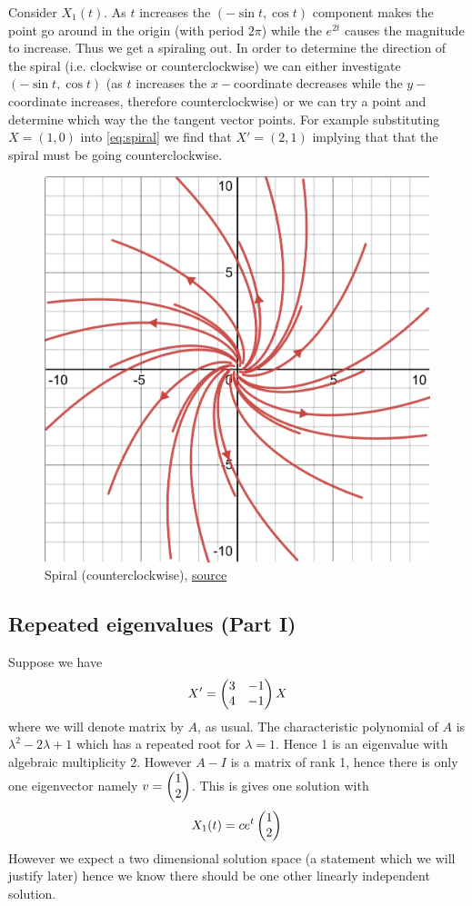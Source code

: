Consider $X_1(t)$. As $t$ increases the $(-\sin t, \cos t)$ component makes the point go around in the origin (with period $2\pi$) while the $e^{2t}$ causes the magnitude to increase. Thus we get a spiraling out. In order to determine the direction of the spiral (i.e. clockwise or counterclockwise) we can either investigate $(-\sin t, \cos t)$ (as $t$ increases the $x-$coordinate decreases while the $y-$coordinate increases, therefore counterclockwise) or we can try a point and determine which way the the tangent vector points. For example substituting $X = (1, 0)$ into \autoref{eq:spiral} we find that $X' = (2, 1)$ implying that that the spiral must be going counterclockwise.


\begin{figure}[ht]
    \centering
    \includegraphics[scale=0.25]{Images/spiral.png}
    \caption{Spiral (counterclockwise), \href{https://www.desmos.com/calculator/sebsp8likc}{source}}
    \label{fig:sprial-cc}
\end{figure}

\subsection{Repeated eigenvalues (Part I)}
Suppose we have
\begin{equation}
    X' = \begin{pmatrix} 3 & -1\\4 & -1 \end{pmatrix} X
\end{equation}
where we will denote matrix by $A$, as usual. The characteristic polynomial of $A$ is $\lambda^2 - 2\lambda + 1$ which has a repeated root for $\lambda = 1$. Hence 1 is an eigenvalue with algebraic multiplicity 2. However $A - I$ is a matrix of rank 1, hence there is only one eigenvector namely $v = \begin{pmatrix} 1\\2 \end{pmatrix}$. This is gives one solution with
$$ X_1(t) = c e^{t} \begin{pmatrix} 1\\2 \end{pmatrix} $$
However we expect a two dimensional solution space (a statement which we will justify later) hence we know there should be one other linearly independent solution.

